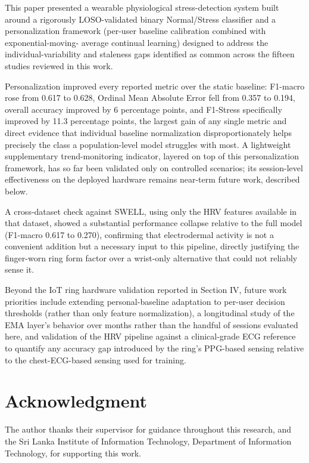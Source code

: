 \documentclass[conference]{IEEEtran}
\begin{document}
This paper presented a wearable physiological stress-detection
system built around a rigorously LOSO-validated binary
Normal/Stress classifier and a personalization framework
(per-user baseline calibration combined with exponential-moving-
average continual learning) designed to address the
individual-variability and staleness gaps identified as common
across the fifteen studies reviewed in this work.

Personalization improved every reported metric over the static
baseline: F1-macro rose from 0.617 to 0.628, Ordinal Mean
Absolute Error fell from 0.357 to 0.194, overall accuracy
improved by 6 percentage points, and F1-Stress specifically
improved by 11.3 percentage points, the largest gain of any
single metric and direct evidence that individual baseline
normalization disproportionately helps precisely the class a
population-level model struggles with most. A lightweight
supplementary trend-monitoring indicator, layered on top of
this personalization framework, has so far been validated only
on controlled scenarios; its session-level effectiveness on
the deployed hardware remains near-term future work, described
below.

A cross-dataset check against SWELL, using only the HRV
features available in that dataset, showed a substantial
performance collapse relative to the full model (F1-macro 0.617
to 0.270), confirming that electrodermal activity is not a
convenient addition but a necessary input to this pipeline,
directly justifying the finger-worn ring form factor over a
wrist-only alternative that could not reliably sense it.

Beyond the IoT ring hardware validation reported in Section IV,
future work priorities include extending personal-baseline
adaptation to per-user decision thresholds (rather than only
feature normalization), a longitudinal study of the EMA layer's
behavior over months rather than the handful of sessions
evaluated here, and validation of the HRV pipeline against a
clinical-grade ECG reference to quantify any accuracy gap
introduced by the ring's PPG-based sensing relative to the
chest-ECG-based sensing used for training.

\section*{Acknowledgment}
The author thanks their supervisor for guidance throughout
this research, and the Sri Lanka Institute of Information
Technology, Department of Information Technology, for
supporting this work.
\end{document}
